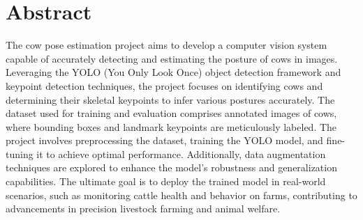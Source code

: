 \documentclass[11pt]{report}
\begin{document}
\maketitle

\chapter*{Abstract}
The cow pose estimation project aims to develop a computer vision system capable of accurately detecting and estimating the posture of cows in images. Leveraging the YOLO (You Only Look Once) object detection framework and keypoint detection techniques, the project focuses on identifying cows and determining their skeletal keypoints to infer various postures accurately. The dataset used for training and evaluation comprises annotated images of cows, where bounding boxes and landmark keypoints are meticulously labeled. The project involves preprocessing the dataset, training the YOLO model, and fine-tuning it to achieve optimal performance. Additionally, data augmentation techniques are explored to enhance the model's robustness and generalization capabilities. The ultimate goal is to deploy the trained model in real-world scenarios, such as monitoring cattle health and behavior on farms, contributing to advancements in precision livestock farming and animal welfare.



\tableofcontents

\newpage
\setcounter{page}{0}







\renewcommand\bibname{References}
\printbibliography

% 
\end{document}

